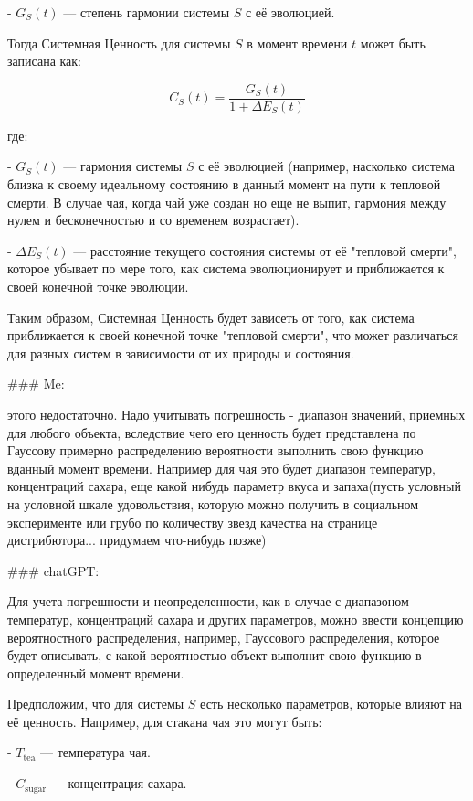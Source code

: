 - \( G_S(t) \) — степень гармонии системы \( S \) с её эволюцией.


Тогда Системная Ценность для системы \( S \) в момент времени \( t \) может быть записана как:


\[

C_S(t) = \frac{G_S(t)}{1 + \Delta E_S(t)}

\]


где:


- \( G_S(t) \) — гармония системы \( S \) с её эволюцией (например, насколько система близка к своему идеальному состоянию в данный момент на пути к тепловой смерти. В случае чая, когда чай уже создан но еще не выпит, гармония между нулем и бесконечностью и со временем возрастает).

- \( \Delta E_S(t) \) — расстояние текущего состояния системы от её "тепловой смерти", которое убывает по мере того, как система эволюционирует и приближается к своей конечной точке эволюции.


Таким образом, Системная Ценность будет зависеть от того, как система приближается к своей конечной точке "тепловой смерти", что может различаться для разных систем в зависимости от их природы и состояния.


### Me:

этого недостаточно. Надо учитывать погрешность - диапазон значений, приемных для любого объекта, вследствие чего его ценность будет представлена по Гауссову примерно распределению вероятности выполнить свою функцию вданный момент времени. Например для чая это будет диапазон температур, концентраций сахара, еще какой нибудь параметр вкуса и запаха(пусть условный на условной шкале удовольствия, которую можно получить в социальном эксперименте или грубо по количеству звезд качества на странице дистрибютора... придумаем что-нибудь позже)

### chatGPT:


Для учета погрешности и неопределенности, как в случае с диапазоном температур, концентраций сахара и других параметров, можно ввести концепцию вероятностного распределения, например, Гауссового распределения, которое будет описывать, с какой вероятностью объект выполнит свою функцию в определенный момент времени.


Предположим, что для системы \( S \) есть несколько параметров, которые влияют на её ценность. Например, для стакана чая это могут быть:


- \( T_{\text{tea}} \) — температура чая.

- \( C_{\text{sugar}} \) — концентрация сахара.

